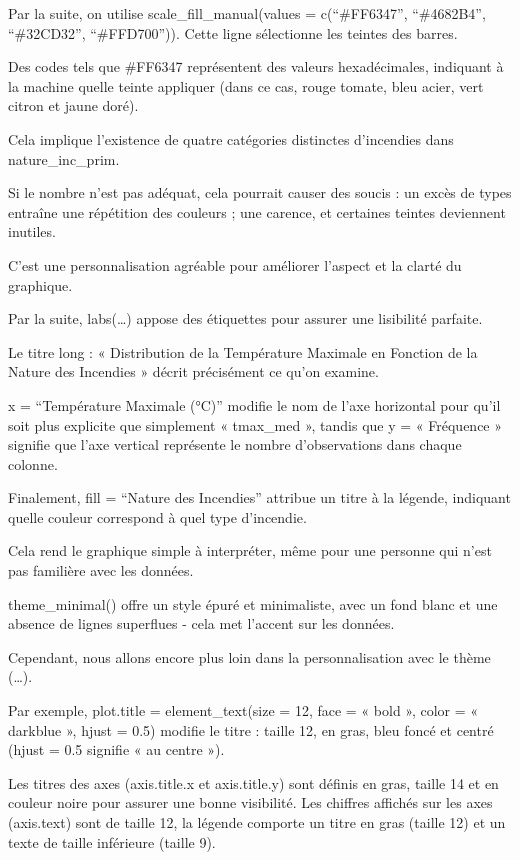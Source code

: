 \documentclass[
]{article}
\begin{document}
Par la suite, on utilise scale\_fill\_manual(values = c(``\#FF6347'',
``\#4682B4'', ``\#32CD32'', ``\#FFD700'')). Cette ligne sélectionne les
teintes des barres.

Des codes tels que \#FF6347 représentent des valeurs hexadécimales,
indiquant à la machine quelle teinte appliquer (dans ce cas, rouge
tomate, bleu acier, vert citron et jaune doré).

Cela implique l'existence de quatre catégories distinctes d'incendies
dans nature\_inc\_prim.

Si le nombre n'est pas adéquat, cela pourrait causer des soucis : un
excès de types entraîne une répétition des couleurs ; une carence, et
certaines teintes deviennent inutiles.

C'est une personnalisation agréable pour améliorer l'aspect et la clarté
du graphique.

Par la suite, labs(\ldots) appose des étiquettes pour assurer une
lisibilité parfaite.

Le titre long : « Distribution de la Température Maximale en Fonction de
la Nature des Incendies » décrit précisément ce qu'on examine.

x = ``Température Maximale (°C)'' modifie le nom de l'axe horizontal
pour qu'il soit plus explicite que simplement « tmax\_med », tandis que
y = « Fréquence » signifie que l'axe vertical représente le nombre
d'observations dans chaque colonne.

Finalement, fill = ``Nature des Incendies'' attribue un titre à la
légende, indiquant quelle couleur correspond à quel type d'incendie.

Cela rend le graphique simple à interpréter, même pour une personne qui
n'est pas familière avec les données.

theme\_minimal() offre un style épuré et minimaliste, avec un fond blanc
et une absence de lignes superflues - cela met l'accent sur les données.

Cependant, nous allons encore plus loin dans la personnalisation avec le
thème (\ldots).

Par exemple, plot.title = element\_text(size = 12, face = « bold »,
color = « darkblue », hjust = 0.5) modifie le titre : taille 12, en
gras, bleu foncé et centré (hjust = 0.5 signifie « au centre »).

Les titres des axes (axis.title.x et axis.title.y) sont définis en gras,
taille 14 et en couleur noire pour assurer une bonne visibilité. Les
chiffres affichés sur les axes (axis.text) sont de taille 12, la légende
comporte un titre en gras (taille 12) et un texte de taille inférieure
(taille 9).
\end{document}
